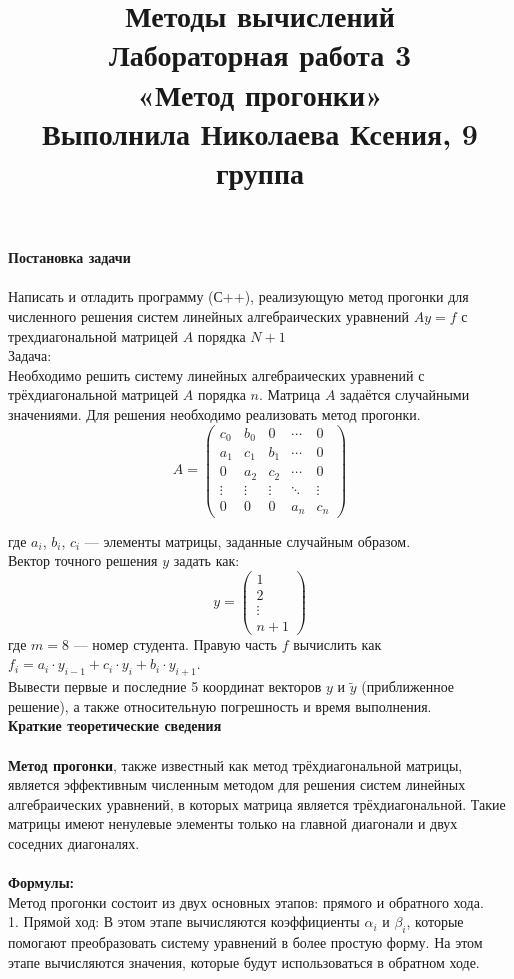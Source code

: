 \documentclass[a4paper, 12pt]{report}
\title{\textbf{\Huge{Методы вычислений}}\\Лабораторная работа 3\\«Метод прогонки»\\Выполнила Николаева Ксения, 9 группа}
\date{}
\begin{document}
    \maketitle

    \textbf{\Huge{Постановка задачи}}\\\\
    Написать и отладить программу (С++), реализующую метод прогонки для численного решения систем линейных алгебраических уравнений $Ay = f$ с трехдиагональной матрицей $A$ порядка $N + 1$\\
    Задача:\\
    Необходимо решить систему линейных алгебраических уравнений с трёхдиагональной матрицей $A$ порядка $n$. Матрица $A$ задаётся случайными значениями. Для решения необходимо реализовать метод прогонки.
\[
A =
\begin{pmatrix}
c_0 & b_0 & 0 & \cdots & 0 \\
a_1 & c_1 & b_1 & \cdots & 0 \\
0 & a_2 & c_2 & \cdots & 0 \\
\vdots & \vdots & \vdots & \ddots & \vdots \\
0 & 0 & 0 & a_{n} & c_{n}
\end{pmatrix}
\]

    где $a_i$, $b_i$, $c_i$ — элементы матрицы, заданные случайным образом.\\
    Вектор точного решения $y$ задать как:
    \[
   y = \begin{pmatrix}
   1 \\
   2 \\
   \vdots \\
   n + 1
   \end{pmatrix}
   \]
   где $m = 8$ — номер студента. Правую часть $f$ вычислить как $f_i = a_{i} \cdot y_{i - 1} + c_{i} \cdot y_{i} + b_{i} \cdot y_{i + 1}$.\\ 
   Вывести первые и последние 5 координат векторов $y$ и $ \tilde{y}$ (приближенное решение), а также относительную погрешность и время выполнения.\\
   

   \newpage
   \textbf{\Huge{Краткие теоретические сведения}}\\\\
   \textbf{Метод прогонки}, также известный как метод трёхдиагональной матрицы, является эффективным численным методом для решения систем линейных алгебраических уравнений, в которых матрица является трёхдиагональной. Такие матрицы имеют ненулевые элементы только на главной диагонали и двух соседних диагоналях.
\\\\
   \textbf{Формулы:}\\
   Метод прогонки состоит из двух основных этапов: прямого и обратного хода.
\\
1. Прямой ход:
   В этом этапе вычисляются коэффициенты $\alpha_i$ и $\beta_i$, которые помогают преобразовать систему уравнений в более простую форму. На этом этапе вычисляются значения, которые будут использоваться в обратном ходе.
\end{document}
